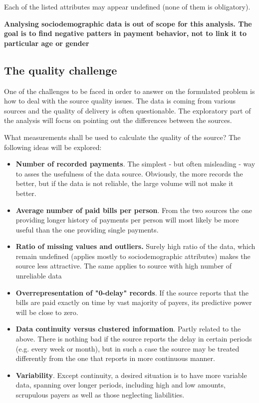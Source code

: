 \documentclass{article}
\begin{document}
Each of the listed attributes may appear undefined (none of them is obligatory).\par 

\textbf{Analysing sociodemographic data is out of scope for this analysis.
The goal is to find negative patters in payment behavior, not to link it to particular age or gender}

\subsection{The quality challenge}
\label{section:intro-quality-challenge}

One of the challenges to be faced in order to answer on the formulated problem is how to deal with the source quality issues.
The data is coming from various sources and the quality of delivery is often questionable.
The exploratory part of the analysis will focus on pointing out the differences between the sources.\par
What measurements shall be used to calculate the quality of the source? The following ideas will be explored:
\begin{itemize}
    \item \textbf{Number of recorded payments}. The simplest - but often misleading - way to asses the usefulness of the data source. Obviously, the more records the better, but if the data is not reliable, the large volume will not make it better.
    \item \textbf{Average number of paid bills per person}. From the two sources the one providing longer history of payments per person will most likely be more useful than the one providing single payments.
    \item \textbf{Ratio of missing values and outliers.} Surely high ratio of the data, which remain undefined (applies mostly to sociodemographic attributes) makes the source less attractive. The same applies to source with high number of unreliable data
    \item \textbf{Overrepresentation of "0-delay" records}. If the source reports that the bills are paid exactly on time by vast majority of payers, its predictive power will be close to zero.
    \item \textbf{Data continuity versus clustered information}. Partly related to the above. There is nothing bad if the source reports the delay in certain periods (e.g. every week or month), but in such a case the source may be treated differently from the one that reports in more continuous manner.
    \item \textbf{Variability}. Except continuity, a desired situation is to have more variable data, spanning over longer periods, including high and low amounts, scrupulous payers as well as those neglecting liabilities.
\end{itemize}
\end{document}
